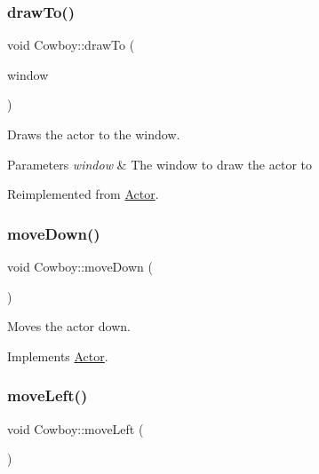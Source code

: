 \subsubsection{\texorpdfstring{drawTo()}{drawTo()}}
{\footnotesize\ttfamily void Cowboy\+::draw\+To (\begin{DoxyParamCaption}\item[{sf\+::\+Render\+Window \&}]{window }\end{DoxyParamCaption})\hspace{0.3cm}{\ttfamily [virtual]}}



Draws the actor to the window. 


\begin{DoxyParams}{Parameters}
{\em window} & The window to draw the actor to \\
\hline
\end{DoxyParams}


Reimplemented from \mbox{\hyperlink{classActor_af73a6f6670f0507c9e55ec2f61293535}{Actor}}.

\mbox{\label{classCowboy_a25b9c66203a4a5e762984ca0bed511e0}} 
\subsubsection{\texorpdfstring{moveDown()}{moveDown()}}
{\footnotesize\ttfamily void Cowboy\+::move\+Down (\begin{DoxyParamCaption}{ }\end{DoxyParamCaption})\hspace{0.3cm}{\ttfamily [virtual]}}



Moves the actor down. 



Implements \mbox{\hyperlink{classActor_ad2737cd62ea0c96f75853afb5d1fd83a}{Actor}}.

\mbox{\label{classCowboy_a487cf6b5d1e37586e6e9b408d2aaad1a}} 
\subsubsection{\texorpdfstring{moveLeft()}{moveLeft()}}
{\footnotesize\ttfamily void Cowboy\+::move\+Left (\begin{DoxyParamCaption}{ }\end{DoxyParamCaption})\hspace{0.3cm}{\ttfamily [virtual]}}



